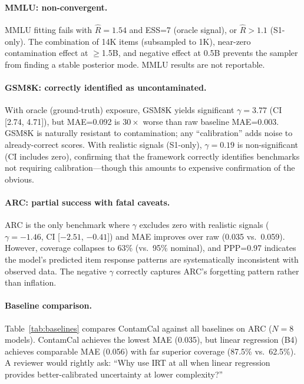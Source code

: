 \documentclass[11pt,a4paper]{article}
\begin{document}
\paragraph{MMLU: non-convergent.}
MMLU fitting fails with $\hat{R}=1.54$ and ESS=7 (oracle signal), or $\hat{R}>1.1$ (S1-only).
The combination of 14K items (subsampled to 1K), near-zero contamination effect at $\geq$1.5B, and negative effect at 0.5B prevents the sampler from finding a stable posterior mode.
MMLU results are not reportable.

\paragraph{GSM8K: correctly identified as uncontaminated.}
With oracle (ground-truth) exposure, GSM8K yields significant $\gamma=3.77$ (CI [2.74, 4.71]), but MAE=0.092 is $30\times$ worse than raw baseline MAE=0.003.
GSM8K is naturally resistant to contamination; any ``calibration'' adds noise to already-correct scores.
With realistic signals (S1-only), $\gamma=0.19$ is non-significant (CI includes zero), confirming that the framework correctly identifies benchmarks not requiring calibration---though this amounts to expensive confirmation of the obvious.

\paragraph{ARC: partial success with fatal caveats.}
ARC is the only benchmark where $\gamma$ excludes zero with realistic signals ($\gamma=-1.46$, CI [$-2.51$, $-0.41$]) and MAE improves over raw (0.035 vs.\ 0.059).
However, coverage collapses to 63\% (vs.\ 95\% nominal), and PPP=0.97 indicates the model's predicted item response patterns are systematically inconsistent with observed data.
The negative $\gamma$ correctly captures ARC's forgetting pattern rather than inflation.

\paragraph{Baseline comparison.}
Table~\ref{tab:baselines} compares ContamCal against all baselines on ARC ($N=8$ models).
ContamCal achieves the lowest MAE (0.035), but linear regression (B4) achieves comparable MAE (0.056) with far superior coverage (87.5\% vs.\ 62.5\%).
A reviewer would rightly ask: ``Why use IRT at all when linear regression provides better-calibrated uncertainty at lower complexity?''
\end{document}
